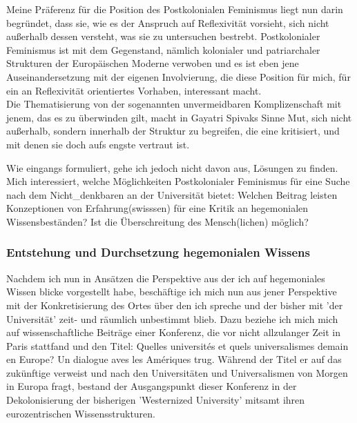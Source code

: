 Meine Präferenz für die Position des Postkolonialen Feminismus liegt nun darin
begründet, dass sie, wie es der Anspruch auf Reflexivität vorsieht, sich nicht
außerhalb dessen versteht, was sie zu untersuchen bestrebt. Postkolonialer
Feminismus ist mit dem Gegenstand, nämlich kolonialer und patriarchaler
Strukturen der Europäischen Moderne verwoben und es ist eben jene
Auseinandersetzung mit der eigenen Involvierung, die diese Position für mich,
für ein an Reflexivität orientiertes Vorhaben, interessant macht. \\
Die
Thematisierung von der sogenannten unvermeidbaren Komplizenschaft mit jenem,
das es zu überwinden gilt, macht in Gayatri Spivaks Sinne Mut, sich nicht
außerhalb, sondern innerhalb der Struktur zu begreifen, die eine kritisiert,
und mit denen sie doch \glqq aufs engste vertraut ist. \grqq \footnotemark 
{}

Wie eingangs formuliert, gehe ich jedoch nicht davon aus, Lösungen zu finden.
Mich interessiert, welche Möglichkeiten Postkolonialer Feminismus für eine
Suche nach dem Nicht\_denkbaren an der Universität bietet: Welchen Beitrag
leisten Konzeptionen von Erfahrung(swisssen) für eine Kritik an hegemonialen
Wissensbeständen? Ist die Überschreitung des Mensch(lichen) möglich?

\subsubsection{Entstehung und Durchsetzung hegemonialen Wissens}

Nachdem ich nun in Ansätzen die Perspektive aus der ich auf hegemoniales Wissen
blicke vorgestellt habe, beschäftige ich mich nun aus jener Perspektive mit der
Konkretisierung des Ortes über den ich spreche und der bisher mit 'der
Universität' zeit- und räumlich unbestimmt blieb. Dazu beziehe ich mich mich
auf wissenschaftliche Beiträge einer Konferenz, die vor nicht allzulanger Zeit
in Paris stattfand und den Titel: \glqq Quelles universités et quels
universalismes demain en Europe? Un dialogue aves les Amériques \grqq
\footnotemark {} trug. Während der Titel er auf das zukünftige
verweist und nach den Universitäten und Universalismen von Morgen in Europa
fragt, bestand der Ausgangspunkt dieser Konferenz in der Dekolonisierung der
bisherigen 'Westernized University' mitsamt ihren eurozentrischen
Wissensstrukturen. 


